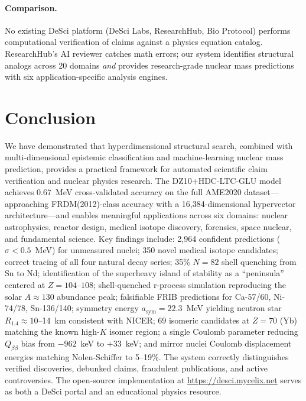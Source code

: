\documentclass[letterpaper,11pt]{article}
\begin{document}
\paragraph{Comparison.} No existing DeSci platform (DeSci Labs, ResearchHub,
Bio Protocol) performs computational verification of claims against a physics
equation catalog. ResearchHub's AI reviewer catches math errors; our system
identifies structural analogs across 20 domains \emph{and} provides
research-grade nuclear mass predictions with six application-specific analysis
engines.

\section{Conclusion}

We have demonstrated that hyperdimensional structural search, combined with
multi-dimensional epistemic classification and machine-learning nuclear mass
prediction, provides a practical framework for automated scientific claim
verification and nuclear physics research. The DZ10+HDC-LTC-GLU model achieves
0.67~MeV cross-validated accuracy on the full AME2020 dataset---approaching
FRDM(2012)-class accuracy with a 16,384-dimensional hypervector
architecture---and enables meaningful applications across six domains: nuclear
astrophysics, reactor design, medical isotope discovery, forensics, space
nuclear, and fundamental science. Key findings include: 2,964 confident
predictions ($\sigma < 0.5$~MeV) for unmeasured nuclei; 350 novel medical
isotope candidates; correct tracing of all four natural decay series; 35\%
$N = 82$ shell quenching from Sn to Nd; identification of the superheavy
island of stability as a ``peninsula'' centered at $Z = 104$--$108$;
shell-quenched r-process simulation reproducing the solar $A \approx 130$
abundance peak; falsifiable FRIB predictions for Ca-57/60, Ni-74/78,
Sn-136/140; symmetry energy $a_\text{sym} = 22.3$~MeV yielding neutron
star $R_{1.4} \approx 10$--14~km consistent with NICER; 69 isomeric
candidates at $Z = 70$ (Yb) matching the known high-$K$ isomer region;
a single Coulomb parameter reducing $Q_{\beta\beta}$ bias from $-962$~keV
to $+33$~keV; and mirror nuclei Coulomb displacement energies matching
Nolen-Schiffer to 5--19\%.
The system correctly distinguishes verified discoveries, debunked claims,
fraudulent publications, and active controversies. The open-source
implementation at \url{https://desci.mycelix.net} serves as both a DeSci
portal and an educational physics resource.


\end{document}
